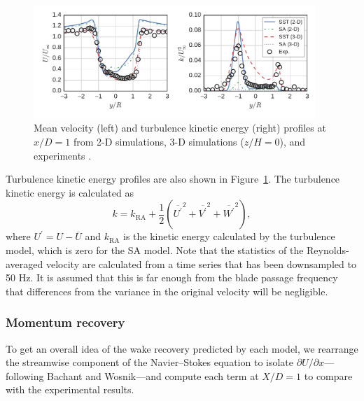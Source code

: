 \documentclass[aip,graphicx]{revtex4-1}
\begin{document}
\begin{figure}
    \centering
    
    \includegraphics[width=0.95\textwidth]{figures/profiles} 
    
    \caption{Mean velocity (left) and turbulence kinetic energy (right) profiles
        at $x/D=1$ from 2-D simulations, 3-D simulations ($z/H=0$), and experiments
        \cite{Bachant2015-JoT}.}
    
    \label{fig:profiles}
\end{figure}

Turbulence kinetic energy profiles are also shown in Figure~\ref{fig:profiles}.
The turbulence kinetic energy is calculated as
\begin{equation}
k = k_{\mathrm{RA}} + \frac{1}{2} \left( 
\overline{U^\prime}^2 + 
\overline{V^\prime}^2 + 
\overline{W^\prime}^2 \right),
\label{eq:k}
\end{equation}
where $U^\prime = U - \overline{U}$ and $k_{\mathrm{RA}}$ is the kinetic energy
calculated by the turbulence model, which is zero for the SA model. Note that
the statistics of the Reynolds-averaged velocity are calculated from a time
series that has been downsampled to 50 Hz. It is assumed that this is far enough
from the blade passage frequency that differences from the variance in the
original velocity will be negligible.


\subsubsection{Momentum recovery}

To get an overall idea of the wake recovery predicted by each model, we
rearrange the streamwise component of the Navier--Stokes equation to isolate
$\partial U / \partial x$---following Bachant and
Wosnik\cite{Bachant2015-JoT}---and compute each term at $X/D = 1$ to compare
with the experimental results.
\end{document}
